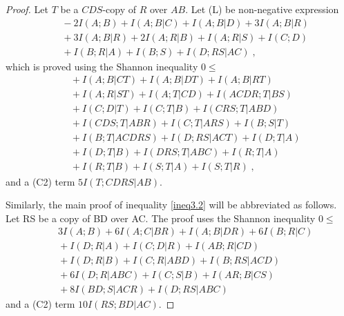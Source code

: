 \documentclass[10pt,journal]{IEEEtran}
\begin{document}
\begin{proof}
Let $T$ be a $CDS$-copy of $R$ over $AB$.  Let (L) be non-negative expression
\begin{align*}
       &\ \ -2I(A;B)+I(A;B|C)+I(A;B|D) +3I(A;B|R)\\
       &\ \ +3I(A;B|R)+2I(A;R|B)+I(A;R|S)+I(C;D) \\
       &\ \ +I(B;R|A) +I(B;S)  +I(D;RS|AC) \; ,
\end{align*}
which is proved using the Shannon inequality $0\leq $
\begin{align*}   &\ \ + I(A;B|CT)+ I(A;B|DT)+ I(A;B|RT) \\
      &\ \ + I(A;R|ST)+ I(A;T|CD)+ I(ACDR;T|BS)  \\
      &\ \ + I(C;D|T)+ I(C;T|B)+ I(CRS;T|ABD) \\
      &\ \ + I(CDS;T|ABR)+ I(C;T|ARS)+ I(B;S|T)\\
      &\ \ + I(B;T|ACDRS)+ I(D;RS|ACT)+ I(D;T|A) \\
      &\ \ + I(D;T|B)+ I(DRS;T|ABC)+ I(R;T|A) \\
      &\ \ + I(R;T|B)+ I(S;T|A)+ I(S;T|R)  \; ,
\end{align*}
and a (C2) term $5I(T;CDRS|AB)$.

Similarly, the main proof of inequality \eqref{ineq3.2} will be abbreviated as follows.
Let RS be a copy of BD over AC.
The proof uses the Shannon inequality $0\leq $
\begin{align*}
        &\ \  3I(A;B) + 6I(A;C|BR)+ I(A;B|DR)+ 6I(B;R|C)\\
        &\ \ + I(D;R|A)+ I(C;D|R)+ I(AB;R|CD) \\
       &\ \ + I(D;R|B)+ I(C;R|ABD)+ I(B;RS|ACD) \\
       &\ \ + 6I(D;R|ABC)+ I(C;S|B)+ I(AR;B|CS) \\
       &\ \ + 8I(BD;S|ACR)+ I(D;RS|ABC)
\end{align*}
and a (C2) term $10I(RS;BD|AC)$.


\end{proof}
\end{document}
